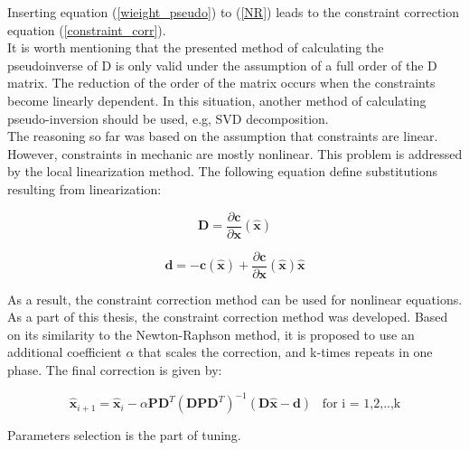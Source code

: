 Inserting equation (\ref{wieight_pseudo}) to (\ref{NR}) leads to the constraint correction equation (\ref{constraint_corr}).\\

It is worth mentioning that the presented method of calculating the pseudoinverse of D is only valid under the assumption of a full order of the D matrix. The reduction of the order of the matrix occurs when the constraints become linearly dependent. In this situation, another method of calculating pseudo-inversion should be used, e.g, SVD decomposition. \cite{golub2013matrix}\\

The reasoning so far was based on the assumption that constraints are linear. 
However, constraints in mechanic are mostly nonlinear. This problem is addressed by the local linearization method. The following equation define substitutions resulting from linearization:

\begin{equation}
	\bm{D} = \frac{\partial \bm{c}}{\partial \bm{x}}(\bm{\hat{x}})
	\label{linearization1}
\end{equation}

\begin{equation}
	\bm{d} =  - \bm{c} (\bm{\hat{x}}) +  \frac{\partial \bm{c}}{\partial \bm{x}}(\bm{\hat{x}}) \bm{\hat{x}}
	\label{linearization2}
\end{equation}

As a result, the constraint correction method can be used for nonlinear equations.\\ 

As a part of this thesis, the constraint correction method was developed. Based on its similarity to the Newton-Raphson method, it is proposed to use an additional coefficient $\alpha$ that scales the correction, and k-times repeats in one phase. The final correction is given by:

\begin{equation}
	\bm{\hat{x}}_{i+1} = \bm{\hat{x}}_{i} - \alpha \bm{P} \bm{D}^T \left( \bm{D} \bm{P} \bm{D}^T \right)^{-1} \left( \bm{D} \bm{\hat{x}} - \bm{d}  \right) \hspace{10pt} \text{for i = 1,2,..,k}
	\label{constraint_final}
\end{equation}

 Parameters selection is the part of tuning.  